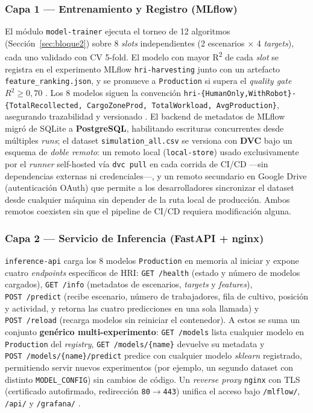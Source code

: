 \documentclass[conference]{IEEEtran}
\begin{document}
\subsubsection{Capa 1 — Entrenamiento y Registro (MLflow)}
El módulo \texttt{model-trainer} ejecuta el torneo de 12 algoritmos (Sección~\ref{sec:bloque2}) sobre 8 \textit{slots} independientes (2 escenarios $\times$ 4 \textit{targets}), cada uno validado con CV 5-fold. El modelo con mayor R\textsuperscript{2} de cada \textit{slot} se registra en el experimento MLflow \texttt{hri-harvesting} junto con un artefacto \texttt{feature\_ranking.json}, y se promueve a \texttt{Production} si supera el \textit{quality gate} $R^2 \geq 0{,}70$ \cite{arunkumar2025}. Los 8 modelos siguen la convención \texttt{hri-\{HumanOnly,WithRobot\}-\{TotalRecollected, CargoZoneProd, TotalWorkload, AvgProduction\}}, asegurando trazabilidad y versionado \cite{singh2025}. El backend de metadatos de MLflow migró de SQLite a \textbf{PostgreSQL}, habilitando escrituras concurrentes desde múltiples \textit{runs}; el dataset \texttt{simulation\_all.csv} se versiona con \textbf{DVC} bajo un esquema de \textit{doble remoto}: un remoto local (\texttt{local-store}) usado exclusivamente por el \textit{runner} self-hosted vía \texttt{dvc pull} en cada corrida de CI/CD —sin dependencias externas ni credenciales—, y un remoto secundario en Google Drive (autenticación OAuth) que permite a los desarrolladores sincronizar el dataset desde cualquier máquina sin depender de la ruta local de producción. Ambos remotos coexisten sin que el pipeline de CI/CD requiera modificación alguna.

\subsubsection{Capa 2 — Servicio de Inferencia (FastAPI + nginx)}
\texttt{inference-api} carga los 8 modelos \texttt{Production} en memoria al iniciar y expone cuatro \textit{endpoints} específicos de HRI: \texttt{GET~/health} (estado y número de modelos cargados), \texttt{GET~/info} (metadatos de escenarios, \textit{targets} y \textit{features}), \texttt{POST~/predict} (recibe escenario, número de trabajadores, fila de cultivo, posición y actividad, y retorna las cuatro predicciones en una sola llamada) y \texttt{POST~/reload} (recarga modelos sin reiniciar el contenedor). A estos se suma un conjunto \textbf{genérico multi-experimento}: \texttt{GET~/models} lista cualquier modelo en \texttt{Production} del \textit{registry}, \texttt{GET~/models/\{name\}} devuelve su metadata y \texttt{POST~/models/\{name\}/predict} predice con cualquier modelo \textit{sklearn} registrado, permitiendo servir nuevos experimentos (por ejemplo, un segundo dataset con distinto \texttt{MODEL\_CONFIG}) sin cambios de código. Un \textit{reverse proxy} \texttt{nginx} con TLS (certificado autofirmado, redirección \texttt{80}$\to$\texttt{443}) unifica el acceso bajo \texttt{/mlflow/}, \texttt{/api/} y \texttt{/grafana/} \cite{ozimek2026}.
\end{document}
